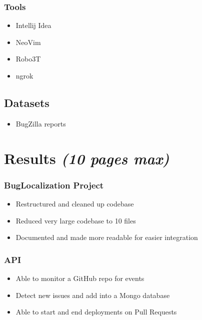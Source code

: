 \documentclass[12pt]{article}
\providecommand{\tightlist}{%
  \setlength{\itemsep}{0pt}\setlength{\parskip}{0pt}}
\begin{document}
\hypertarget{tools}{%
\subsubsection{Tools}\label{tools}}

\begin{itemize}
\tightlist
\item
  Intellij Idea
\item
  NeoVim
\item
  Robo3T
\item
  ngrok
\end{itemize}

\hypertarget{datasets}{%
\subsection{Datasets}\label{datasets}}

\begin{itemize}
\tightlist
\item
  BugZilla reports
\end{itemize}

\hypertarget{results-10-pages-max}{%
\section{\texorpdfstring{Results \emph{(10 pages
max)}}{Results (10 pages max)}}\label{results-10-pages-max}}

\hypertarget{buglocalization-project}{%
\subsubsection{BugLocalization Project}\label{buglocalization-project}}

\begin{itemize}
\tightlist
\item
  Restructured and cleaned up codebase
\item
  Reduced very large codebase to 10 files
\item
  Documented and made more readable for easier integration
\end{itemize}

\hypertarget{api}{%
\subsubsection{API}\label{api}}

\begin{itemize}
\tightlist
\item
  Able to monitor a GitHub repo for events
\item
  Detect new issues and add into a Mongo database
\item
  Able to start and end deployments on Pull Requests
\end{itemize}
\end{document}
